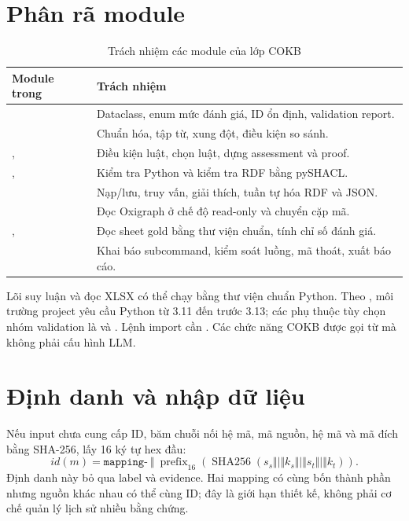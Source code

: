 \section{Phân rã module}
\begin{table}[htbp]
\centering\small
\caption{Trách nhiệm các module của lớp COKB}\label{tab:modules}
\begin{tabularx}{\textwidth}{p{4.0cm}Y}
\toprule
Module trong  & Trách nhiệm\\
\midrule
{} & Dataclass, enum mức đánh giá, ID ổn định, validation report.\\
 & Chuẩn hóa, tập từ, xung đột, điều kiện so sánh.\\
,  & Điều kiện luật, chọn luật, dựng assessment và proof.\\
,  & Kiểm tra Python và kiểm tra RDF bằng pySHACL.\\
 & Nạp/lưu, truy vấn, giải thích, tuần tự hóa RDF và JSON.\\
 & Đọc Oxigraph ở chế độ read-only và chuyển cặp mã.\\
,  & Đọc sheet gold bằng thư viện chuẩn, tính chỉ số đánh giá.\\
 & Khai báo subcommand, kiểm soát luồng, mã thoát, xuất báo cáo.\\
\bottomrule
\end{tabularx}
\end{table}

Lõi suy luận và đọc XLSX có thể chạy bằng thư viện chuẩn Python.
Theo , môi trường project yêu cầu Python từ 3.11 đến
trước 3.13; các phụ thuộc tùy chọn nhóm validation là
 và . Lệnh import cần .
Các chức năng COKB được gọi từ  mà không phải cấu hình LLM.

\section{Định danh và nhập dữ liệu}
Nếu input chưa cung cấp ID,  băm chuỗi nối hệ mã,
mã nguồn, hệ mã và mã đích bằng SHA-256, lấy 16 ký tự hex đầu:
\begin{equation}
 id(m)=\texttt{mapping-}\ \Vert\
 \operatorname{prefix}_{16}\!\left(
 \operatorname{SHA256}(s_s\Vert | \Vert k_s\Vert | \Vert s_t\Vert | \Vert k_t)
 \right).
\end{equation}
Định danh này bỏ qua label và evidence. Hai mapping có cùng bốn thành
phần nhưng nguồn khác nhau có thể cùng ID; đây là giới hạn thiết kế,
không phải cơ chế quản lý lịch sử nhiều bằng chứng.

